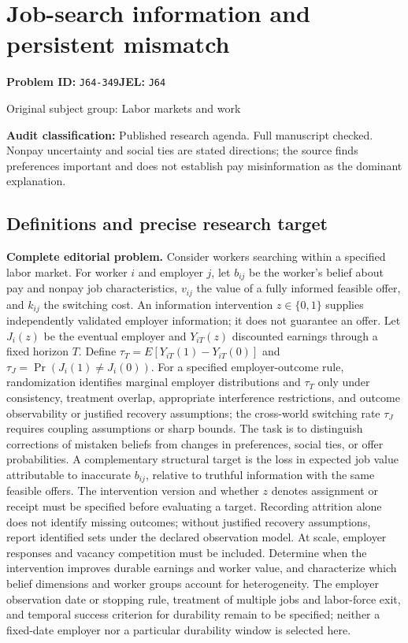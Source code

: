\documentclass[11pt,a4paper]{article}
\begin{document}
\section*{Job-search information and persistent mismatch}
\textbf{Problem ID:} \texttt{J64-349}\quad \textbf{JEL:} \texttt{J64}\par
\label{problem:OP-0352}
\label{audited:ECON-095}
\label{audited:ECON-096}
{\sffamily\small\color{muted}Original subject group: Labor markets and work\par}
\label{definitions:problem:30007634}
\textbf{Audit classification:} Published research agenda. Full manuscript checked. Nonpay uncertainty and social ties are stated directions; the source finds preferences important and does not establish pay misinformation as the dominant explanation.
\subsection*{Definitions and precise research target}
\textbf{Complete editorial problem.} Consider workers searching within a specified labor market. For worker \(i\) and employer \(j\), let \(b_{ij}\) be the worker's belief about pay and nonpay job characteristics, \(v_{ij}\) the value of a fully informed feasible offer, and \(k_{ij}\) the switching cost. An information intervention \(z\in\{0,1\}\) supplies independently validated employer information; it does not guarantee an offer. Let \(J_i(z)\) be the eventual employer and \(Y_{iT}(z)\) discounted earnings through a fixed horizon \(T\). Define \(\tau_T=E[Y_{iT}(1)-Y_{iT}(0)]\) and \(\tau_J=\Pr(J_i(1)\ne J_i(0))\). For a specified employer-outcome rule, randomization identifies marginal employer distributions and \(\tau_T\) only under consistency, treatment overlap, appropriate interference restrictions, and outcome observability or justified recovery assumptions; the cross-world switching rate \(\tau_J\) requires coupling assumptions or sharp bounds. The task is to distinguish corrections of mistaken beliefs from changes in preferences, social ties, or offer probabilities. A complementary structural target is the loss in expected job value attributable to inaccurate \(b_{ij}\), relative to truthful information with the same feasible offers. The intervention version and whether \(z\) denotes assignment or receipt must be specified before evaluating a target. Recording attrition alone does not identify missing outcomes; without justified recovery assumptions, report identified sets under the declared observation model. At scale, employer responses and vacancy competition must be included. Determine when the intervention improves durable earnings and worker value, and characterize which belief dimensions and worker groups account for heterogeneity. The employer observation date or stopping rule, treatment of multiple jobs and labor-force exit, and temporal success criterion for durability remain to be specified; neither a fixed-date employer nor a particular durability window is selected here.
\end{document}

